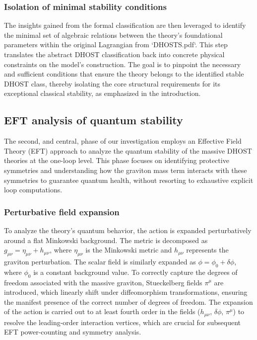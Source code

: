 \documentclass[twocolumn]{aastex631}
\begin{document}
\subsubsection{Isolation of minimal stability conditions}
The insights gained from the formal classification are then leveraged to identify the minimal set of algebraic relations between the theory's foundational parameters within the original Lagrangian from `DHOSTS.pdf`. This step translates the abstract DHOST classification back into concrete physical constraints on the model's construction. The goal is to pinpoint the necessary and sufficient conditions that ensure the theory belongs to the identified stable DHOST class, thereby isolating the core structural requirements for its exceptional classical stability, as emphasized in the introduction.

\subsection{EFT analysis of quantum stability}
The second, and central, phase of our investigation employs an Effective Field Theory (EFT) approach to analyze the quantum stability of the massive DHOST theories at the one-loop level. This phase focuses on identifying protective symmetries and understanding how the graviton mass term interacts with these symmetries to guarantee quantum health, without resorting to exhaustive explicit loop computations.

\subsubsection{Perturbative field expansion}
To analyze the theory's quantum behavior, the action is expanded perturbatively around a flat Minkowski background. The metric is decomposed as $g_{\mu\nu} = \eta_{\mu\nu} + h_{\mu\nu}$, where $\eta_{\mu\nu}$ is the Minkowski metric and $h_{\mu\nu}$ represents the graviton perturbation. The scalar field is similarly expanded as $\phi = \phi_0 + \delta\phi$, where $\phi_0$ is a constant background value. To correctly capture the degrees of freedom associated with the massive graviton, Stueckelberg fields $\pi^\mu$ are introduced, which linearly shift under diffeomorphism transformations, ensuring the manifest presence of the correct number of degrees of freedom. The expansion of the action is carried out to at least fourth order in the fields ($h_{\mu\nu}$, $\delta\phi$, $\pi^\mu$) to resolve the leading-order interaction vertices, which are crucial for subsequent EFT power-counting and symmetry analysis.
\end{document}
